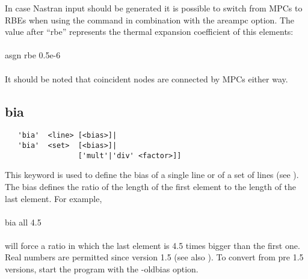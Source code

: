 \documentclass{article}
\begin{document}
In case Nastran input should be generated it is possible to switch from MPCs to RBEs when using the  command in combination with the areampc option. The value after ``rbe'' represents the thermal expansion coefficient of this elements:\\\\asgn rbe 0.5e-6\\\\It should be noted that coincident nodes are connected by MPCs either way.
  
\subsection{\label{bia}bia}
\begin{verbatim}
   'bia'  <line> [<bias>]|
   'bia'  <set>  [<bias>]|
                 ['mult'|'div' <factor>]]
\end{verbatim}
This keyword is used to define the bias of a single line or of a set of lines (see ). The bias defines the ratio of the length of the first element to the length of the last element. For example,\\\\
bia all 4.5\\\\will force a ratio in which the last element is 4.5 times bigger than the first one. Real numbers are permitted since version 1.5 (see also ). To convert from pre 1.5 versions, start the program with the -oldbias option.
  
\end{document}
